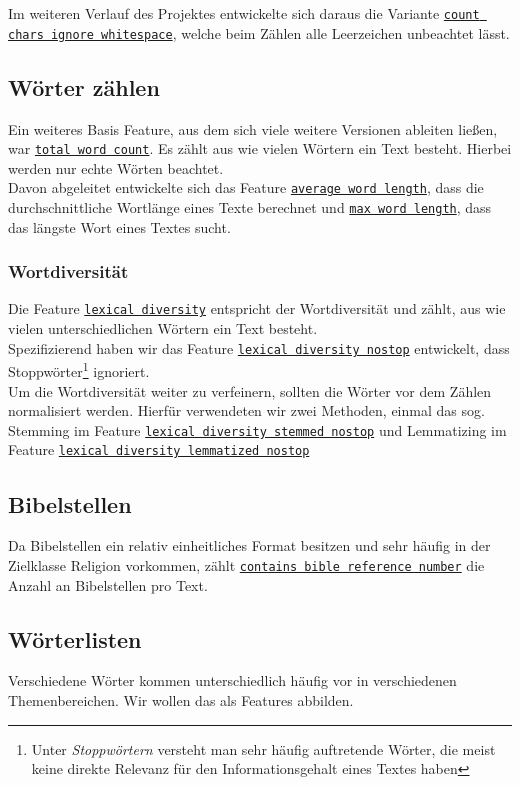 \documentclass[
	11pt,
	a4paper
]{scrartcl}
\newcommand{\code}[1]{\texttt{\ul{#1}}}
\begin{document}
Im weiteren Verlauf des Projektes entwickelte sich daraus die Variante \code{count chars ignore whitespace}, welche beim Zählen alle
Leerzeichen unbeachtet lässt. 

\subsection{Wörter zählen}\label{woerterZaehlen}
Ein weiteres Basis Feature, aus dem sich viele weitere Versionen ableiten ließen, war \code{total word count}. Es zählt aus wie vielen
Wörtern ein Text besteht. Hierbei werden nur echte Wörten beachtet.\\
Davon abgeleitet entwickelte sich das Feature \code{average word length}, dass die durchschnittliche Wortlänge eines Texte berechnet und
\code{max word length}, dass das längste Wort eines Textes sucht.

\subsubsection{Wortdiversität}\label{wortdiversitaet}
Die Feature \code{lexical diversity} entspricht der Wortdiversität und zählt, aus wie vielen unterschiedlichen Wörtern ein Text besteht.\\
Spezifizierend haben wir das Feature \code{lexical diversity nostop} entwickelt, dass Stoppwörter\footnote{Unter \emph{Stoppwörtern}
versteht man sehr häufig auftretende Wörter, die meist keine direkte Relevanz für den Informationsgehalt eines Textes haben} ignoriert. \\

Um die Wortdiversität weiter zu verfeinern, sollten die Wörter vor dem Zählen normalisiert werden. Hierfür verwendeten wir zwei Methoden,
einmal das sog. Stemming im Feature \code{lexical diversity stemmed nostop} und Lemmatizing im Feature \code{lexical diversity lemmatized
nostop}

\subsection{Bibelstellen}\label{bibelstellen}
Da Bibelstellen ein relativ einheitliches Format besitzen und sehr häufig in der Zielklasse Religion vorkommen, zählt \code{contains bible
reference number} die Anzahl an Bibelstellen pro Text.

\subsection{Wörterlisten}\label{woerterlisten}
Verschiedene Wörter kommen unterschiedlich häufig vor in verschiedenen Themenbereichen. Wir wollen das als Features abbilden.
\end{document}
